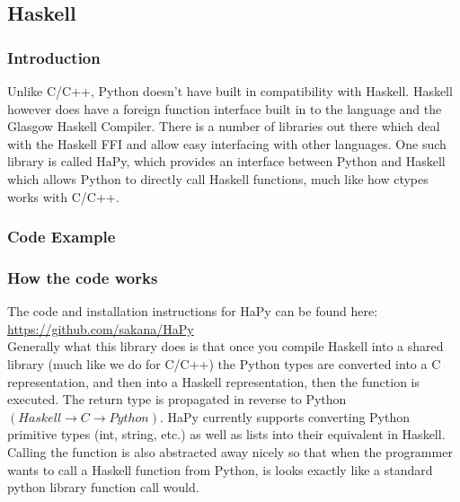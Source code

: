\documentclass[12pt]{article}
\begin{document}
    \subsection{Haskell}
        \subsubsection{Introduction}
            Unlike C/C++, Python doesn't have built in compatibility with Haskell. Haskell however
            does have a foreign function interface built in to the language and the Glasgow Haskell
            Compiler. There is a number of libraries out there which deal with the Haskell FFI and
            allow easy interfacing with other languages. One such library is called HaPy, which
            provides an interface between Python and Haskell which allows Python to directly call
            Haskell functions, much like how ctypes works with C/C++.
        \subsubsection{Code Example}
            
            
            
        \subsubsection{How the code works}
            The code and installation instructions for HaPy can be
            found here: \\ \url{https://github.com/sakana/HaPy} \\
            Generally what this library does is that once you compile Haskell into a
            shared library (much like we do for C/C++) the Python types are converted into
            a C representation, and then into a Haskell representation, then the function is
            executed. The return type is propagated in reverse to Python 
            $(Haskell \rightarrow C \rightarrow Python)$.
            HaPy currently supports converting Python primitive types (int, string, etc.) 
            as well as lists into their equivalent in Haskell. Calling the function is also
            abstracted away nicely so that when the programmer wants to call a Haskell 
            function from Python, is looks exactly like a standard python library
            function call would.
            
\end{document}
